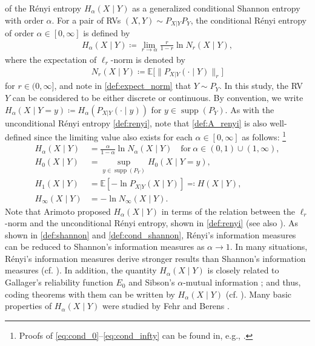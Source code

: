 \documentclass[conference, draftcls, onecolumn]{IEEEtran}
\theoremstyle{plain}
\newcommand{\supp}{\operatorname{supp}}
\begin{document}
of the R\'{e}nyi entropy $H_{\alpha}(X \mid Y)$ as a generalized conditional Shannon entropy with order $\alpha$.
For a pair of RVs $(X, Y) \sim P_{X|Y} P_{Y}$, the conditional R\'{e}nyi entropy \cite{arimoto} of order $\alpha \in [0, \infty]$ is defined by
\begin{align}
H_{\alpha}(X \mid Y)
\coloneqq
\lim_{r \to \alpha} \frac{ r }{ 1 - r } \ln N_{r}(X \mid Y) ,
\label{def:A_renyi}
\end{align}
where the expectation of $\ell_{r}$-norm is denoted by
\begin{align}
N_{r}(X \mid Y)
\coloneqq
\mathbb{E} \big[ \| P_{X|Y}(\cdot \mid Y) \|_{r} \big]
\label{def:expect_norm}
\end{align}
for $r \in (0, \infty]$, and note in \eqref{def:expect_norm} that $Y \sim P_{Y}$.
In this study, the RV $Y$ can be considered to be either discrete or continuous.
By convention, we write $H_{\alpha}(X \mid Y = y) \coloneqq H_{\alpha}( P_{X|Y}(\cdot \mid y) )$ for $y \in \supp(P_{Y})$.
As with the unconditional R\'{e}nyi entropy \eqref{def:renyi}, note that \eqref{def:A_renyi} is also well-defined since the limiting value also exists for each $\alpha \in [0, \infty]$ as follows:%
\footnote{Proofs of \eqref{eq:cond_0}--\eqref{eq:cond_infty} can be found in, e.g., \cite[Propositions~1 and~2]{fehr}.}
\begin{align}
H_{\alpha}(X \mid Y)
& =
\frac{ \alpha }{ 1 - \alpha } \ln N_{\alpha}(X \mid Y)
\quad \mathrm{for} \ \alpha \in (0, 1) \cup (1, \infty) ,
\\
H_{0}(X \mid Y)
& =
\sup_{y \in \supp(P_{Y})} H_{0}(X \mid Y = y) ,
\label{eq:cond_0} \\
H_{1}(X \mid Y)
& =
\mathbb{E}[ - \ln P_{X|Y}(X \mid Y) ]
\eqqcolon
H(X \mid Y) ,
\label{def:cond_shannon} \\
H_{\infty}(X \mid Y)
& =
- \ln N_{\infty}(X \mid Y) .
\label{eq:cond_infty}
\end{align}
Note that Arimoto \cite{arimoto} proposed $H_{\alpha}(X \mid Y)$ in terms of the relation between the $\ell_{r}$-norm and the unconditional R\'{e}nyi entropy, shown in \eqref{def:renyi} (see also \cite[Section~II-A]{ita}).
As shown in \eqref{def:shannon} and \eqref{def:cond_shannon}, R\'{e}nyi's information measures can be reduced to Shannon's information measures as $\alpha \to 1$.
In many situations, R\'{e}nyi's information measures derive stronger results than Shannon's information measures (cf. \cite{arikan, bunte, campbell, csiszar, tomamichel}).
In addition, the quantity $H_{\alpha}(X \mid Y)$ is closely related to Gallager's reliability function $E_{0}$ \cite[Eq.~(5.6.14)]{gallager} and Sibson's $\alpha$-mutual information \cite{sibson, ho}; and thus, coding theorems with them can be written by $H_{\alpha}(X \mid Y)$ (cf. \cite{arimoto, ita}).
Many basic properties of $H_{\alpha}(X \mid Y)$ were studied by Fehr and Berens \cite{fehr}.
\end{document}
